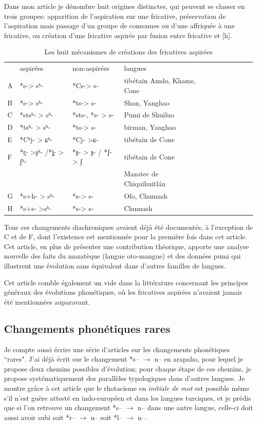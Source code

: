 \documentclass[oldfontcommands,oneside,a4paper,11pt]{memoir}
\begin{document}
Dans mon article je dénombre huit origines distinctes, qui peuvent se classer en trois groupes: apparition de l'aspiration sur une fricative, préservation de l'aspiration mais passage d'un groupe de consonnes ou d'une affriquée à une fricative, ou création d'une fricative aspirée par fusion entre fricative et [h].
\begin{table}[H]
\caption{Les huit mécanismes de créations des fricatives aspirées} \label{tab:aspirated fricatives}
\begin{tabular}{lllllllllll}  \toprule
 	&	aspirées	&	non-aspirées	&	langues	\\
A	&	*s-> sʰ-	&	*Cs-> s-	&	tibétain Amdo, Khams, Cone 	\\
B	&	*s-> sʰ-	&	*ts-> s-	&	Shan, Yanghao	\\
C	&	*stsʰ- > sʰ-	&	*sts-, *s- > s-	&	Pumi de Shuiluo 	\\
D	&	*tsʰ- > sʰ-	&	*ts-> s-	&	birman, Yanghao	\\
E	&	*Cʰj- > ɕʰ-	&	*Cj- >ɕ-	&	tibétain de Cone 	\\
F	&	*r̥- >ʂʰ- /*j̥- > ʃʰ-	&	*ʂ- > ʂ- / *ʃ- > ʃ	&	tibétain de Cone \\

&&&Mazatec de Chiquihuitlán \\
G	&	*s+h- > sʰ-	&	*s-> s-	&	Ofo, Chumash	\\
H	&	*s+s- >sʰ-	&	*s-> s-	&	Chumash	\\
\bottomrule
\end{tabular}
\end{table}
Tous ces changements diachroniques avaient déjà été documentés, à l'exception de C et de F, dont l'existence est mentionnée pour la première fois dans cet article. Cet article, en plus de présenter une contribution théorique, apporte une analyse nouvelle des faits du mazatèque (langue oto-mangue) et des données pumi qui illustrent une évolution sans équivalent dans d'autres familles de langues.

Cet article comble également un vide dans la littérature concernant les principes généraux des évolutions phonétiques, où les fricatives aspirées n'avaient jamais été mentionnées auparavant.

\subsection{Changements phonétiques rares}

Je compte aussi écrire une série d'articles sur les changements phonétiques ``rares". J'ai déjà écrit \citet{jacques13arapaho} sur le changement *s-- $\rightarrow $ n-- en arapaho, pour lequel je propose deux chemins possibles d'évolution; pour chaque étape de ces chemins, je propose systématiquement des parallèles typologiques dans d'autres langues. Je montre grâce à cet article que  le rhotacisme en \textit{initiale de mot} est possible même s'il n'est guère attesté en indo-européen et dans les langues turciques, et je prédis que si l'on retrouve un changement *s-- $\rightarrow $ n-- dans une autre langue, celle-ci doit aussi avoir subi soit *r-- $\rightarrow $ n-- soit *l-- $\rightarrow $ n--.
\end{document}
